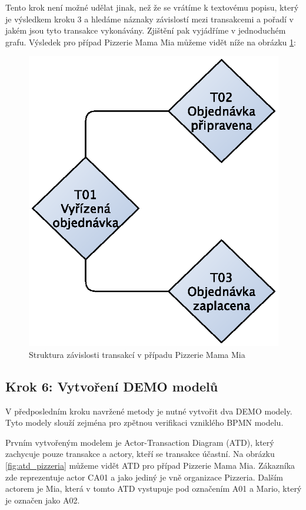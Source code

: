\documentclass[]{article}
\begin{document}
Tento krok není možné udělat jinak, než že se vrátíme k textovému popisu, který je výsledkem kroku 3 a hledáme náznaky závislostí mezi transakcemi a pořadí v jakém jsou tyto transakce vykonávány. Zjištění pak vyjádříme v jednoduchém grafu. Výsledek pro případ Pizzerie Mama Mia můžeme vidět níže na obrázku \ref{fig:result_structure_chart}:

\begin{figure}[H]\centering
\includegraphics[scale=0.75]{obrazky/result-structure-chart-pizzeria}
\caption{Struktura závislosti transakcí v případu Pizzerie Mama Mia}
\label{fig:result_structure_chart}
\end{figure}

\subsection{Krok 6: Vytvoření DEMO modelů}
V předposledním kroku navržené metody je nutné vytvořit dva DEMO modely. Tyto modely slouží zejména pro zpětnou verifikaci vzniklého BPMN modelu.

Prvním vytvořeným modelem je Actor-Transaction Diagram (ATD), který zachycuje pouze transakce a actory, kteří se transakce účastní. Na obrázku \ref{fig:atd_pizzeria} můžeme vidět ATD pro případ Pizzerie Mama Mia. Zákazníka zde reprezentuje actor CA01 a jako jediný je vně organizace Pizzeria. Dalším actorem je Mia, která v tomto ATD vystupuje pod označením A01 a Mario, který je označen jako A02.
\end{document}
